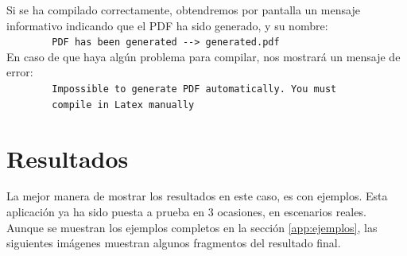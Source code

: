 \documentclass[a4paper, 12pt]{book}
\begin{document}
Si se ha compilado correctamente, obtendremos por pantalla un mensaje informativo indicando que el PDF ha sido generado, y su nombre:\\
\verb"        PDF has been generated --> generated.pdf"\\

En caso de que haya algún problema para compilar, nos mostrará un mensaje de error:\\
\verb"        Impossible to generate PDF automatically. You must"\\
\verb"        compile in Latex manually"



\cleardoublepage
\chapter{Resultados}
\label{chap:resultados}
La mejor manera de mostrar los resultados en este caso, es con ejemplos. Esta aplicación ya ha sido puesta a prueba en 3 ocasiones, en escenarios reales.\\

Aunque se muestran los ejemplos completos en la sección \ref{app:ejemplos}, las siguientes imágenes muestran algunos fragmentos del resultado final.\\
\end{document}
